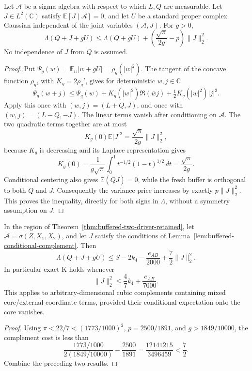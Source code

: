 \begin{lemma}
\label{lem:buffered-conditional-complement}
Let \(\mathcal A\) be a sigma algebra with respect to which \(L,Q\)
are measurable. Let \(J\in L^2(\mathbb C)\) satisfy
\(\mathbb E[J\mid\mathcal A]=0\), and let \(U\) be a standard proper
complex Gaussian independent of the joint variables
\((\mathcal A,J)\). For \(g>0\),
\[
 \boxed{\Lambda(Q+J+gU)
 \le \Lambda(Q+gU)
       +\left(\frac{\sqrt\pi}{2g}-p\right)\|J\|_2^2.}
\]
No independence of \(J\) from \(Q\) is assumed.
\end{lemma}
\begin{proof}
Put \(\Psi_g(w)=\mathbb E_U|w+gU|=\rho_g(|w|^2)\).
The tangent of the concave function \(\rho_g\), with
\(K_g=2\rho_g'\), gives for deterministic \(w,j\in\mathbb C\)
\[
 \Psi_g(w+j)\le
 \Psi_g(w)+K_g(|w|^2)\Re(\bar wj)
                  +\tfrac12K_g(|w|^2)|j|^2.
\]
Apply this once with \((w,j)=(L+Q,J)\), and once with
\((w,j)=(L-Q,-J)\). The linear terms vanish after conditioning on
\(\mathcal A\). The two quadratic terms together are at most
\[
 K_g(0)\mathbb E|J|^2
 =\frac{\sqrt\pi}{2g}\|J\|_2^2,
\]
because \(K_g\) is decreasing and its Laplace representation gives
\[
 K_g(0)=\frac1{g\sqrt\pi}
       \int_0^1t^{-1/2}(1-t)^{1/2}\,dt
       =\frac{\sqrt\pi}{2g}.
\]
Conditional centering also gives
\(\mathbb E(\bar QJ)=0\), while the fresh buffer is orthogonal to
both \(Q\) and \(J\). Consequently the variance price increases by
exactly \(p\|J\|_2^2\). This proves the inequality, directly for both
signs in \(\Lambda\), without a symmetry assumption on \(J\).
\end{proof}

\begin{corollary}
\label{cor:buffered-two-driver-complement}
In the region of Theorem~\ref{thm:buffered-two-driver-retained},
let \(\mathcal A=\sigma(Z,X_1,X_2)\), and let \(J\) satisfy the
conditions of Lemma~\ref{lem:buffered-conditional-complement}.
Then
\[
 \Lambda(Q+J+gU)
 \le S-2k_4-\frac{e_{AB}}{2000}+\frac72\|J\|_2^2.
\]
In particular exact K holds whenever
\[
 \boxed{\|J\|_2^2\le\frac47k_4+\frac{e_{AB}}{7000}.}
\]
This applies to arbitrary-dimensional cubic complements containing
mixed core/external-coordinate terms, provided their conditional
expectation onto the core vanishes.
\end{corollary}
\begin{proof}
Using \(\pi<22/7<(1773/1000)^2\), \(p=2500/1891\), and
\(g>1849/10000\), the complement cost is less than
\[
 \frac{1773/1000}{2(1849/10000)}-\frac{2500}{1891}
 =\frac{12141215}{3496459}<\frac72.
\]
Combine the preceding two results.
\end{proof}

